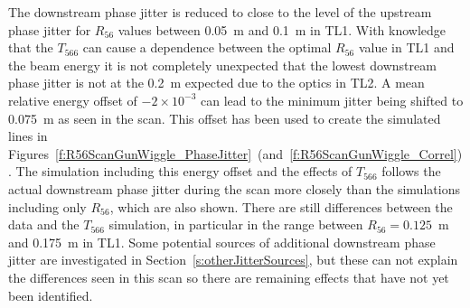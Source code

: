 The downstream phase jitter is reduced to close to the level of the upstream phase jitter for \(R_{56}\) values between 0.05~m and 0.1~m in TL1.  With knowledge that the \(T_{566}\) can cause a dependence between the optimal \(R_{56}\) value in TL1 and the beam energy it is not completely unexpected that the lowest downstream phase jitter is not at the 0.2~m expected due to the optics in TL2. A mean relative energy offset of \(-2\times10^{-3}\) can lead to the minimum jitter being shifted to 0.075~m as seen in the scan. This offset has been used to create the simulated lines  in Figures~\ref{f:R56ScanGunWiggle_PhaseJitter}~(and~\ref{f:R56ScanGunWiggle_Correl}). The simulation including this energy offset and the effects of \(T_{566}\) follows the actual downstream phase jitter during the scan more closely than the simulations including only \(R_{56}\), which are also shown. There are still differences between the data and the \(T_{566}\) simulation, in particular in the range between \(R_{56} = 0.125\)~m and 0.175~m in TL1. Some potential sources of additional downstream phase jitter are investigated in Section~\ref{s:otherJitterSources}, but these can not explain the differences seen in this scan so there are remaining effects that have not yet been identified.

